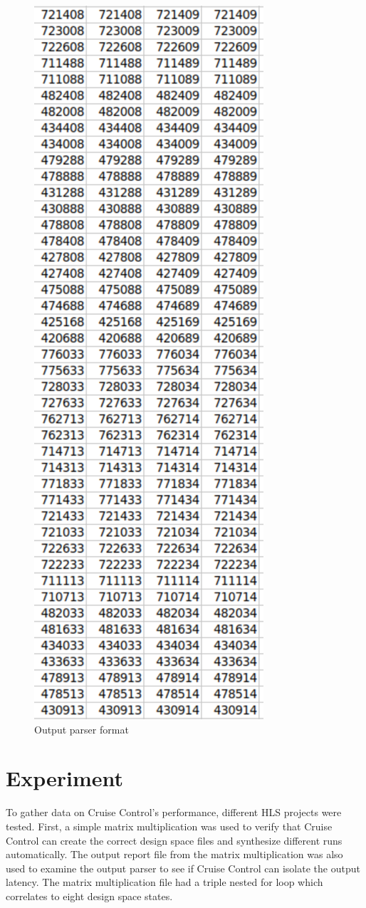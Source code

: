\documentclass[letterpaper, 10 pt, conference]{IEEEconf}  %
\begin{document}
\begin{figure}[H]
\centering
\includegraphics[scale=.5]{outputparser.png} 
\caption{Output parser format}
\end{figure}

\section{Experiment}
To gather data on Cruise Control's performance, different HLS projects were tested. First, a simple matrix multiplication was used to verify that Cruise Control can create the correct design space files and synthesize different runs automatically. The output report file from the matrix multiplication was also used to examine the output parser to see if Cruise Control can isolate the output latency. The matrix multiplication file had a triple nested for loop which correlates to eight design space states. \newline 
\end{document}
